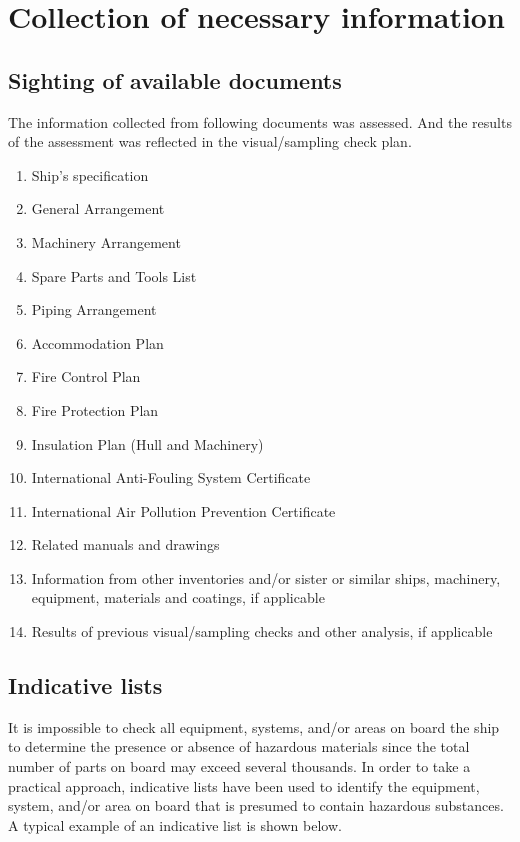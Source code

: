 \documentclass{article}
\begin{document}
\section{Collection of necessary information}

\subsection{Sighting of available documents}

The information collected from following documents was assessed.
And the results of the assessment was reflected in the visual/sampling check
plan.

\begin{enumerate}

\item Ship's specification
\item General Arrangement
\item Machinery Arrangement
\item Spare Parts and Tools List
\item Piping Arrangement
\item Accommodation Plan
\item Fire Control Plan
\item Fire Protection Plan
\item Insulation Plan (Hull and Machinery)
\item International Anti-Fouling System Certificate
\item International Air Pollution Prevention Certificate
\item Related manuals and drawings
\item Information from other inventories and/or sister or similar ships,
machinery, equipment, materials and coatings, if applicable
\item Results of previous visual/sampling checks and other analysis, if applicable

\end{enumerate}
\subsection{Indicative lists}
It is impossible to check all equipment, systems, and/or areas on board the ship
to determine the presence or absence of hazardous materials since the total
number of parts on board may exceed several thousands. In order to take a
practical approach, indicative lists have been used to identify the equipment,
system, and/or area on board that is presumed to contain hazardous
substances.
A typical example of an indicative list is shown below.
\end{document}
